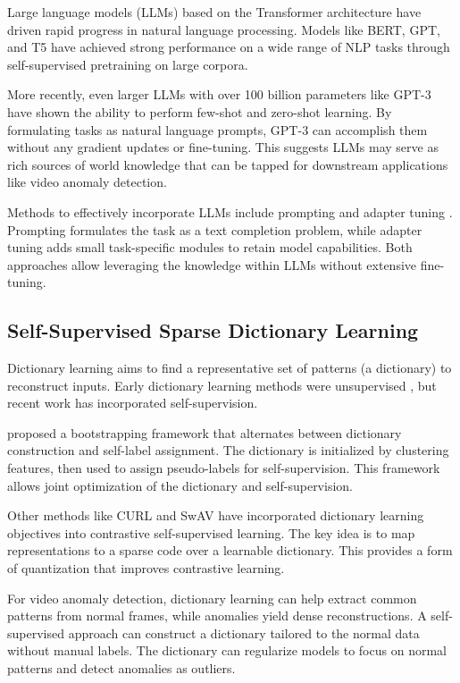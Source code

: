 Large language models (LLMs) based on the Transformer architecture \citep{a-vaswani2017attention} have driven rapid progress in natural language processing. Models like BERT\citep{a-devlin2018bert}, GPT\citep{a-radford2018improving}, and T5\citep{a-raffel2020exploring} have achieved strong performance on a wide range of NLP tasks through self-supervised pretraining on large corpora.

More recently, even larger LLMs with over 100 billion parameters like GPT-3\citep{a-brown2020language} have shown the ability to perform few-shot and zero-shot learning. By formulating tasks as natural language prompts, GPT-3 can accomplish them without any gradient updates or fine-tuning. This suggests LLMs may serve as rich sources of world knowledge that can be tapped for downstream applications like video anomaly detection.

Methods to effectively incorporate LLMs include prompting \citep{a-liu2023pre} and adapter tuning \citep{a-houlsby2019parameter}. Prompting formulates the task as a text completion problem, while adapter tuning adds small task-specific modules to retain model capabilities. Both approaches allow leveraging the knowledge within LLMs without extensive fine-tuning.

\subsection{Self-Supervised Sparse Dictionary Learning}

Dictionary learning aims to find a representative set of patterns (a dictionary) to reconstruct inputs. Early dictionary learning methods were unsupervised \citep{a-aharon2006k}, but recent work has incorporated self-supervision.

\citet{a-shao2021ssdl} proposed a bootstrapping framework that alternates between dictionary construction and self-label assignment. The dictionary is initialized by clustering features, then used to assign pseudo-labels for self-supervision. This framework allows joint optimization of the dictionary and self-supervision.

Other methods like CURL \citep{a-laskin2020curl} and SwAV \citep{a-caron2020unsupervised} have incorporated dictionary learning objectives into contrastive self-supervised learning. The key idea is to map representations to a sparse code over a learnable dictionary. This provides a form of quantization that improves contrastive learning.

%
For video anomaly detection, dictionary learning can help extract common patterns from normal frames, while anomalies yield dense reconstructions. A self-supervised approach can construct a dictionary tailored to the normal data without manual labels. The dictionary can regularize models to focus on normal patterns and detect anomalies as outliers.

